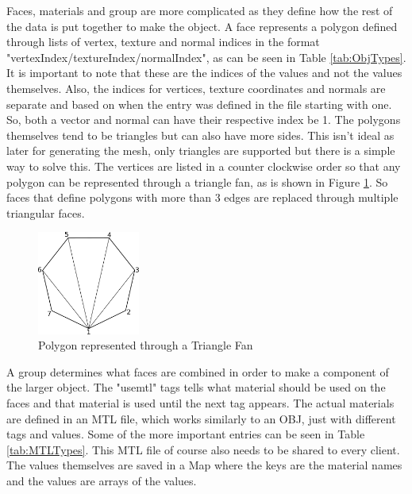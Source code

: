 Faces, materials and group are more complicated as they define how the rest of the data is put together to make the object. A face represents a polygon defined through lists of vertex, texture and normal indices in the format "vertexIndex/textureIndex/normalIndex", as can be seen in Table \ref{tab:ObjTypes}. It is important to note that these are the indices of the values and not the values themselves. Also, the indices for vertices, texture coordinates and normals are separate and based on when the entry was defined in the file starting with one. So, both a vector and normal can have their respective index be 1. The polygons themselves tend to be triangles but can also have more sides. This isn't ideal as later for generating the mesh, only triangles are supported but there is a simple way to solve this. The vertices are listed in a counter clockwise order so that any polygon can be represented through a triangle fan, as is shown in Figure \ref{fig:TriangleFan}. So faces that define polygons with more than 3 edges are replaced through multiple triangular faces.

\begin{figure}[htpb]
	\centering
	\includegraphics[width=0.3\textwidth]{fig/TriangleFan.pdf}
	\caption[OBJ Polygon to Triangle Fan]{Polygon represented through a Triangle Fan\protect}
	\label{fig:TriangleFan}
\end{figure}

A group determines what faces are combined in order to make a component of the larger object. The "usemtl" tags tells what material should be used on the faces and that material is used until the next tag appears. The actual materials are defined in an \acs{MTL} file, which works similarly to an OBJ, just with different tags and values\cite{bib:MTL}. Some of the more important entries can be seen in Table \ref{tab:MTLTypes}. This \acs{MTL} file of course also needs to be shared to every client. The values themselves are saved in a Map where the keys are the material names and the values are arrays of the values.

